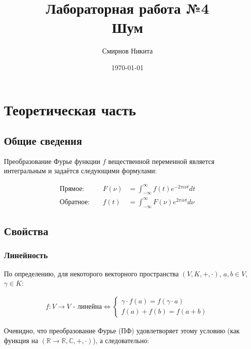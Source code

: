 \documentclass[a4paper,12pt]{report}
\title{Лабораторная работа №4\\Шум}
\author{Смирнов Никита}
\date{\today}
\begin{document}
\maketitle
\tableofcontents
\listoffigures
\lstlistoflistings

\maketitle

\chapter{Теоретическая часть}
\section{Общие сведения}

Преобразование Фурье функции $f$ вещественной переменной является интегральным и задаётся следующими формулами: 
    
\[
    \begin{aligned}
        \text{Прямое: } && F(\nu) &= \int_{-\infty}^{\infty} f(t) e^{-2\pi i\nu t} dt \\
        \text{Обратное: } && f(t) &=  \int_{-\infty}^{\infty} F(\nu) e^{2\pi i\nu t} d\nu
    \end{aligned}
\]

\section{Свойства}
\subsection{Линейность}
    
По определению, для некоторого векторного пространства $(V,K,+,\cdot)$, $a,b \in V$, $\gamma \in K$:

\[
    \begin{aligned}
        f: V \rightarrow V \text{ - линейна}
        \Longleftrightarrow
        \begin{cases}
                \gamma\cdot f(a) = f(\gamma\cdot a) \\
                f(a) + f(b) = f(a + b)
        \end{cases}
    \end{aligned}
\]
    
Очевидно, что преобразование Фурье (ПФ) удовлетворяет этому условию (как функция на $(\mathbb{R} \rightarrow \mathbb{R},\mathbb{C},+,\cdot)$), а следовательно:
\end{document}
